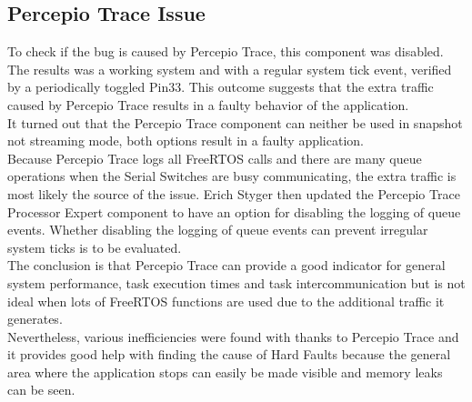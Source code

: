\subsection{Percepio Trace Issue}
%
%
To check if the bug is caused by Percepio Trace, this component was disabled. The results was a working system and with a regular system tick event, verified by a periodically toggled Pin33. This outcome suggests that the extra traffic caused by Percepio Trace results in a faulty behavior of the application.\\
It turned out that the Percepio Trace component can neither be used in snapshot not streaming mode, both options result in a faulty application.\\
Because Percepio Trace logs all FreeRTOS calls and there are many queue operations when the Serial Switches are busy communicating, the extra traffic is most likely the source of the issue. Erich Styger then updated the Percepio Trace Processor Expert component to have an option for disabling the logging of queue events. Whether disabling the logging of queue events can prevent irregular system ticks is to be evaluated.\\
The conclusion is that Percepio Trace can provide a good indicator for general system performance, task execution times and task intercommunication but is not ideal when lots of FreeRTOS functions are used due to the additional traffic it generates.\\
Nevertheless, various inefficiencies were found with thanks to Percepio Trace and it provides good help with finding the cause of Hard Faults because the general area where the application stops can easily be made visible and memory leaks can be seen.
%
%
%
